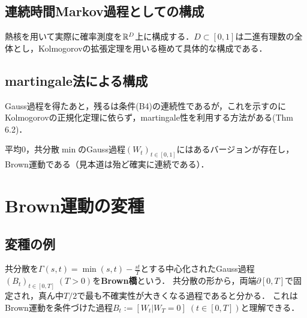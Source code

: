 \documentclass[uplatex,dvipdfmx]{jsreport}
\begin{document}
\subsection{連続時間Markov過程としての構成}

\begin{tcolorbox}[colframe=ForestGreen, colback=ForestGreen!10!white,breakable,colbacktitle=ForestGreen!40!white,coltitle=black,fonttitle=\bfseries\sffamily,
title=]
    熱核を用いて実際に確率測度を$\mathbb{R}^D$上に構成する．$D\subset[0,1]$は二進有理数の全体とし，Kolmogorovの拡張定理を用いる極めて具体的な構成である\cite{舟木}．
\end{tcolorbox}

\subsection{martingale法による構成}

\begin{tcolorbox}[colframe=ForestGreen, colback=ForestGreen!10!white,breakable,colbacktitle=ForestGreen!40!white,coltitle=black,fonttitle=\bfseries\sffamily,
title=]
    Gauss過程を得たあと，残るは条件(B4)の連続性であるが，これを示すのにKolmogorovの正規化定理に依らず，martingale性を利用する方法がある\cite{Bass}(Thm 6.2)．
\end{tcolorbox}


\begin{theorem}[martingaleによる正則化]
    平均$0$，共分散$\min$のGauss過程$(W_t)_{t\in[0,1]}$にはあるバージョンが存在し，Brown運動である（見本道は殆ど確実に連続である）．
\end{theorem}

\section{Brown運動の変種}

\subsection{変種の例}

\begin{definition}
    共分散を$\Gamma(s,t)=\min(s,t)-\frac{st}{T}$とする中心化されたGauss過程$(B_t)_{t\in[0,T]}\;(T>0)$を\textbf{Brown橋}という．
    共分散の形から，両端$\partial[0,T]$で固定され，真ん中$T/2$で最も不確実性が大きくなる過程であると分かる．
    これはBrown運動を条件づけた過程$B_t:=[W_t|W_T=0]\;(t\in[0,T])$と理解できる．
\end{definition}
\end{document}
